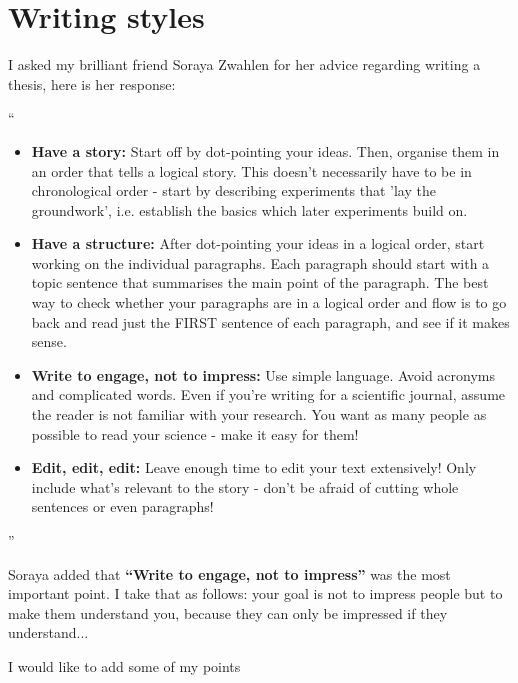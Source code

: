 \chapter{Writing styles}

I asked my brilliant friend Soraya Zwahlen for her advice regarding writing a thesis, here is her response:

``\begin{itemize}
    \item \textbf{Have a story:}
Start off by dot-pointing your ideas. Then, organise them in an order that tells a logical story. This doesn't necessarily have to be in chronological order - start by describing experiments that 'lay the groundwork', i.e. establish the basics which later experiments build on.
    \item \textbf{Have a structure:}
After dot-pointing your ideas in a logical order, start working on the individual paragraphs. Each paragraph should start with a topic sentence that summarises the main point of the paragraph. The best way to check whether your paragraphs are in a logical order and flow is to go back and read just the FIRST sentence of each paragraph, and see if it makes sense.
    \item \textbf{Write to engage, not to impress:}
Use simple language. Avoid acronyms and complicated words. Even if you're writing for a scientific journal, assume the reader is not familiar with your research. You want as many people as possible to read your science - make it easy for them!
    \item \textbf{Edit, edit, edit:}
Leave enough time to edit your text extensively! Only include what's relevant to the story - don't be afraid of cutting whole sentences or even paragraphs! 
\end{itemize}''

Soraya added that \textbf{``Write to engage, not to impress''} was the most important point. I take that as follows: your goal is not to impress people but to make them understand you, because they can only be impressed if they understand...

I would like to add some of my points

